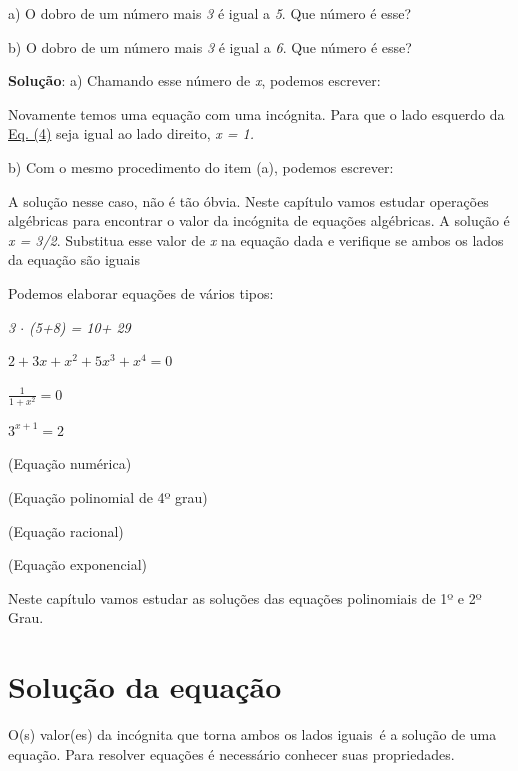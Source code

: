 \begin{texemplo}
a) O dobro de um número mais \textit{3} é igual a \textit{5}. Que número é esse?

b) O dobro de um número mais \textit{3} é igual a \textit{6}. Que número é esse?

\textbf{Solução}: a) Chamando esse número de \textit{x}, podemos escrever:


Novamente temos uma equação com uma incógnita. Para que o lado esquerdo da \hyperref[eqc:4.4]{Eq. (4)} seja igual ao lado direito, \textit{x = 1. }

b) Com o mesmo procedimento do item (a), podemos escrever:


\begin{justify}
A solução nesse caso, não é tão óbvia. Neste capítulo vamos estudar operações algébricas para encontrar o valor da incógnita de equações algébricas. A solução é \textit{x = 3/2}. Substitua esse valor de \textit{x} na equação dada e verifique se ambos os lados da equação são iguais \qedsymbol{}
\end{justify}

\end{texemplo}

Podemos elaborar equações de vários tipos:

\begin{multicols}{2}
\textit{3 $ \cdot $  (5+8) = 10+ 29}

\( 2+3x+x^{2}+5x^{3}+x^{4}=0 \)

\( \frac{1}{1+x^{2}}=0 \)

\( 3^{x+1}=2 \)

(Equação numérica)

(Equação polinomial de 4º grau)

(Equação racional)

(Equação exponencial)
\end{multicols}

Neste capítulo vamos estudar as soluções das equações polinomiais de 1º e 2º Grau.

\section{Solução da equação}

O(s) valor(es) da incógnita que torna ambos os lados iguais~é a  solução de uma equação. Para resolver equações é necessário conhecer suas propriedades.

